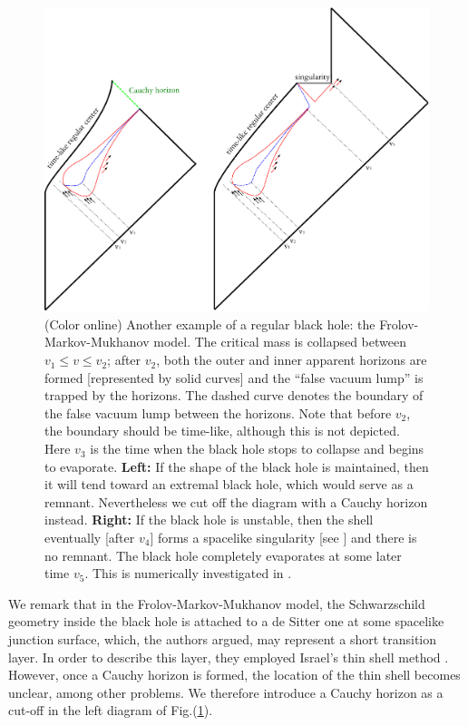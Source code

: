 \documentclass[12pt]{article}
\newcommand{\2}{$^2$}
\newcommand{\3}{$^3$}
\newcommand{\4}{$_4$}
\newcommand{\5}{$_5$}
\begin{document}
\begin{figure}
\begin{center}
\includegraphics[scale=0.48]{regular_3-eps-converted-to.pdf}
\caption{ \label{fig:regular} (Color online) Another example of a regular black hole: the Frolov-Markov-Mukhanov model. The critical mass is collapsed between $v_{1} \leqslant v \leqslant v_{2}$; after $v_{2}$, both the outer and inner apparent horizons are formed [represented by solid curves] and the ``false vacuum lump'' is trapped by the horizons. The dashed curve denotes the boundary of the false vacuum lump between the  horizons. Note that before $v_{2}$, the boundary should be time-like, although this is not depicted.  Here $v_{3}$ is the time when the black hole stops to collapse and begins to evaporate. \textbf{Left:} If the shape of the black hole is maintained, then it will tend toward an extremal black hole, which would serve as a remnant. Nevertheless we cut off the diagram with a Cauchy horizon instead. \textbf{Right:} If the black hole is unstable, then the shell eventually [after $v_{4}$] forms a spacelike singularity [see \cite{Yeom:2008qw1}] and there is no remnant. The black hole completely evaporates at some later time $v_5$. This is numerically investigated in \cite{Hwang:2012nn}.}
\end{center}
\end{figure}


We remark that in the Frolov-Markov-Mukhanov model, the Schwarzschild geometry inside the black hole is attached to a de Sitter one at some spacelike junction surface, which, the authors argued, may represent a short transition layer. In order to describe this layer, they employed Israel's thin shell method \cite{Israel}. However, once a Cauchy horizon is formed, the location of the thin shell becomes unclear, among other problems. We therefore introduce a Cauchy horizon as a cut-off in the left diagram of Fig.(\ref{fig:regular}). 
\end{document}
